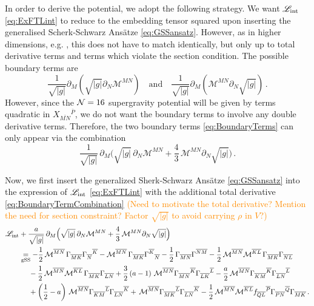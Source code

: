 \documentclass[a4paper, 11pt]{article}
\numberwithin{equation}{section}
\newcommand{\ov}[1]{\overline{#1}}
\newcommand{\+}{\oplus}
\newcommand{\gM}{\mathcal{M}}
\newcommand{\fl}[1]{\ov{#1}}
\newcommand{\dg}{\vert g \vert}
\newcommand{\M}{\ensuremath{\mathcal{M}}\xspace}
\newcommand{\CE}[1]{\textcolor{darkorange}{#1}}
\begin{document}
In order to derive the potential, we adopt the following strategy. We want $\mathscr{L}_{\rm int}$ \eqref{eq:ExFTLint} to reduce to the embedding tensor squared upon inserting the generalised Scherk-Schwarz Ans\"{a}tze \eqref{eq:GSSansatz}. However, as in higher dimensions, e.g. \cite{Berman:2012uy,Musaev:2013rq,Blair:2014zba}, this does not have to match identically, but only up to total derivative terms and terms which violate the section condition. The possible boundary terms are
\begin{equation} \label{eq:BoundaryTerms}
	\frac{1}{\sqrt{\dg}} \partial_M \left(\sqrt{\dg} \partial_N \gM^{MN} \right) \quad \text{and} \quad \frac{1}{\sqrt{\dg}} \partial_M \left( \gM^{MN} \partial_N \sqrt{\dg}\right) \,.
\end{equation}
However, since the ${\cal N}=16$ supergravity potential will be given by terms quadratic in $X_{\fl{MN}}{}^{\fl{P}}$, we do not want the boundary terms to involve any double derivative terms. Therefore, the two boundary terms \eqref{eq:BoundaryTerms} can only appear via the combination
\begin{equation} \label{eq:BoundaryTermCombination}
	\frac{1}{\sqrt{\dg}}\,\partial_{M}\Big(\sqrt{\dg}\,\partial_{N}\M^{MN}+\frac{4}{3}\,\M^{MN}\partial_{N}\sqrt{\dg}\Big) \,.
\end{equation}

Now, we first insert the generalized Sherk-Schwarz Ansätze \eqref{eq:GSSansatz} into the expression of $\mathscr{L}_{\rm int}$ \eqref{eq:ExFTLint} with the additional total derivative \eqref{eq:BoundaryTermCombination} \CE{(Need to motivate the total derivative? Mention the need for section constraint? Factor $\sqrt{\vert g\vert}$ to avoid carrying $\rho$ in $V$?)}
\begin{equation} \label{eq:Lintexpansion}
	\begin{aligned}
		\mathscr{L}_{\rm int} &+ \frac{a}{\sqrt{\vert g\vert}}\,\partial_{M}\Big(\sqrt{\vert g\vert}\,\partial_{N}\M^{MN}+\frac{4}{3}\,\M^{MN}\partial_{N}\sqrt{\vert g\vert}\Big)\\
		&\underset{\rm gSS}{=} -\frac{1}{2}\,\M^{\fl{MN}}\,\Gamma_{\fl{MK}}\Gamma_{\fl{N}}{}^{\fl{K}} -\M^{\fl{MN}}\,\Gamma_{\fl{MK}}\Gamma^{\fl{K}}{}_{\fl{N}} -\frac{1}{2}\,\Gamma_{\fl{MN}}\Gamma^{\fl{NM}} - \frac{1}{2}\,\M^{\fl{MN}}\M^{\fl{KL}}\,\Gamma_{\fl{MK}}\Gamma_{\fl{NL}} \\
		&\ \quad - \frac{1}{2}\,\M^{\fl{MN}}\M^{\fl{KL}}\,\Gamma_{\fl{MK}}\Gamma_{\fl{LN}} +\frac{3}{2}\left(a-1\right)\,\M^{\fl{MN}}\Gamma_{\fl{MN}}{}^{\fl{K}}\Gamma_{\fl{LK}}{}^{\fl{L}}-\frac{a}{2}\,\M^{\fl{MN}}\Gamma_{\fl{KM}}{}^{\fl{K}}\Gamma_{\fl{LN}}{}^{\fl{L}}\\
		&\ \quad + \left(\frac{1}{2}-a\right)\,\M^{\fl{MN}}\Gamma_{\fl{KM}}{}^{\fl{L}}\Gamma_{\fl{LN}}{}^{\fl{K}}+\,\M^{\fl{MN}}\Gamma_{\fl{MK}}{}^{\fl{L}}\Gamma_{\fl{LN}}{}^{\fl{K}}-\frac{1}{2}\,\M^{\fl{MN}}\M^{\fl{KL}}f_{\fl{QL}}{}^{\fl{P}}\Gamma_{\fl{PN}}{}^{\fl{Q}}\Gamma_{\fl{MK}}\,.
	\end{aligned}
\end{equation}
\end{document}
